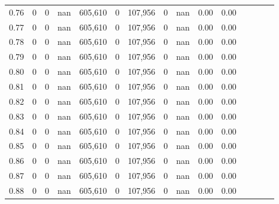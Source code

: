 \begin{tabular}{rrrcrrrrrrrrrrr}
0.76 &        0 &       0 &                                        nan &  605,610 &        0 &  107,956 &        0 &   nan &  0.00 &                         0.00 \\
0.77 &        0 &       0 &                                        nan &  605,610 &        0 &  107,956 &        0 &   nan &  0.00 &                         0.00 \\
0.78 &        0 &       0 &                                        nan &  605,610 &        0 &  107,956 &        0 &   nan &  0.00 &                         0.00 \\
0.79 &        0 &       0 &                                        nan &  605,610 &        0 &  107,956 &        0 &   nan &  0.00 &                         0.00 \\
0.80 &        0 &       0 &                                        nan &  605,610 &        0 &  107,956 &        0 &   nan &  0.00 &                         0.00 \\
0.81 &        0 &       0 &                                        nan &  605,610 &        0 &  107,956 &        0 &   nan &  0.00 &                         0.00 \\
0.82 &        0 &       0 &                                        nan &  605,610 &        0 &  107,956 &        0 &   nan &  0.00 &                         0.00 \\
0.83 &        0 &       0 &                                        nan &  605,610 &        0 &  107,956 &        0 &   nan &  0.00 &                         0.00 \\
0.84 &        0 &       0 &                                        nan &  605,610 &        0 &  107,956 &        0 &   nan &  0.00 &                         0.00 \\
0.85 &        0 &       0 &                                        nan &  605,610 &        0 &  107,956 &        0 &   nan &  0.00 &                         0.00 \\
0.86 &        0 &       0 &                                        nan &  605,610 &        0 &  107,956 &        0 &   nan &  0.00 &                         0.00 \\
0.87 &        0 &       0 &                                        nan &  605,610 &        0 &  107,956 &        0 &   nan &  0.00 &                         0.00 \\
0.88 &        0 &       0 &                                        nan &  605,610 &        0 &  107,956 &        0 &   nan &  0.00 &                         0.00 \\

\end{tabular}
